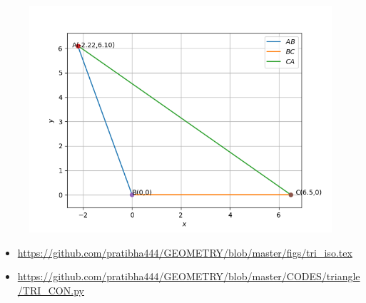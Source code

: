 \begin{frame}
\begin{figure}
\includegraphics[scale=.4]{./CODES/triangle/TRI_CON.png}
\end{figure}
\begin{itemize}
\item \url{https://github.com/pratibha444/GEOMETRY/blob/master/figs/tri_iso.tex}
\item \url{https://github.com/pratibha444/GEOMETRY/blob/master/CODES/triangle/TRI_CON.py}
\end{itemize}
\end{frame}